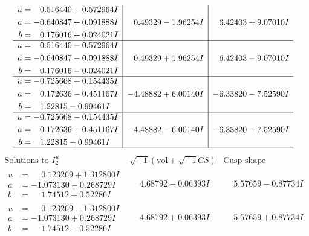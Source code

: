\documentclass[1p]{elsarticle_modified}
\theoremstyle{definition}
\newcommand{\I}{\sqrt{-1}}
\begin{document}
$$\begin{array}{c|c|c}
\begin{aligned}
u &= \phantom{-}0.516440 + 0.572964 I \\
a &= -0.640847 + 0.091888 I \\
b &= \phantom{-}0.176016 + 0.024021 I\end{aligned}
 & \phantom{-}0.49329 - 1.96254 I & \phantom{-}6.42403 + 9.07010 I \\ \hline\begin{aligned}
u &= \phantom{-}0.516440 - 0.572964 I \\
a &= -0.640847 - 0.091888 I \\
b &= \phantom{-}0.176016 - 0.024021 I\end{aligned}
 & \phantom{-}0.49329 + 1.96254 I & \phantom{-}6.42403 - 9.07010 I \\ \hline\begin{aligned}
u &= -0.725668 + 0.154435 I \\
a &= \phantom{-}0.172636 - 0.451167 I \\
b &= \phantom{-}1.22815 - 0.99461 I\end{aligned}
 & -4.48882 + 6.00140 I & -6.33820 - 7.52590 I \\ \hline\begin{aligned}
u &= -0.725668 - 0.154435 I \\
a &= \phantom{-}0.172636 + 0.451167 I \\
b &= \phantom{-}1.22815 + 0.99461 I\end{aligned}
 & -4.48882 - 6.00140 I & -6.33820 + 7.52590 I\\
 \hline 
 \end{array}$$\newpage$$\begin{array}{c|c|c}  
\text{Solutions to }I^u_{2}& \I (\text{vol} + \sqrt{-1}CS) & \text{Cusp shape}\\
 \hline 
\begin{aligned}
u &= \phantom{-}0.123269 + 1.312800 I \\
a &= -1.073130 - 0.268729 I \\
b &= \phantom{-}1.74512 + 0.52286 I\end{aligned}
 & \phantom{-}4.68792 - 0.06393 I & \phantom{-}5.57659 - 0.87734 I \\ \hline\begin{aligned}
u &= \phantom{-}0.123269 - 1.312800 I \\
a &= -1.073130 + 0.268729 I \\
b &= \phantom{-}1.74512 - 0.52286 I\end{aligned}
 & \phantom{-}4.68792 + 0.06393 I & \phantom{-}5.57659 + 0.87734 I \\ \hline\begin{aligned}

\end{aligned}
\end{array}$$
\end{document}
